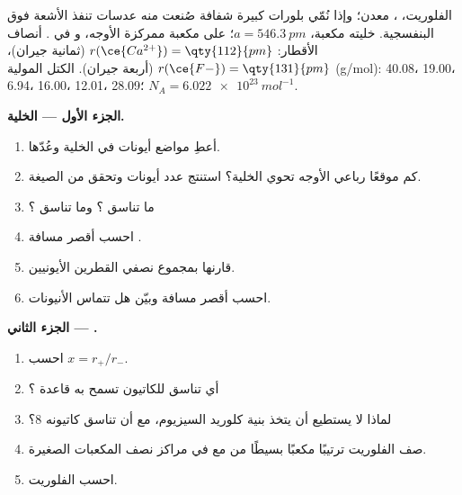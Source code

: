 \begin{problem}
\label{pb:b1:crystals-ionic-covalent:1}
الفلوريت، ، معدن؛ وإذا نُمّي بلورات كبيرة شفافة صُنعت منه
عدسات تنفذ الأشعة فوق البنفسجية. خليته مكعبة، $a =
\qty{546.3}{pm}$؛  على  مكعبة ممركزة الأوجه، و في
. أنصاف الأقطار: $r(\ce{Ca^{2+}}) = \qty{112}{pm}$ (ثمانية
جيران)، $r(\ce{F-}) = \qty{131}{pm}$ (أربعة جيران). الكتل المولية
(g/mol):  40.08،  19.00،  6.94،  16.00، 
12.01،  28.09؛ $N_A = \qty{6.022e23}{mol^{-1}}$.

\medskip
\noindent\textbf{الجزء الأول --- الخلية.}
\begin{enumerate}
  \item أعطِ مواضع أيونات  في الخلية وعُدّها.
  \item كم موقعًا رباعي الأوجه تحوي الخلية؟ استنتج
        عدد أيونات  وتحقق من الصيغة.
  \item ما تناسق ؟ وما تناسق ؟
  \item احسب أقصر مسافة .
  \item قارنها بمجموع نصفي القطرين الأيونيين.
  \item احسب أقصر مسافة  وبيّن هل
        تتماس الأنيونات.
\end{enumerate}

\medskip
\noindent\textbf{الجزء الثاني --- .}
\begin{enumerate}[resume]
  \item احسب $x = r_+/r_-$.
  \item أي تناسق للكاتيون تسمح به قاعدة ؟
  \item لماذا لا يستطيع  أن يتخذ بنية كلوريد السيزيوم، مع أن
        تناسق كاتيونه 8؟
  \item صف الفلوريت ترتيبًا مكعبًا بسيطًا من  مع
         في مراكز نصف المكعبات الصغيرة.
  \item احسب  الفلوريت.
\end{enumerate}


\end{problem}
